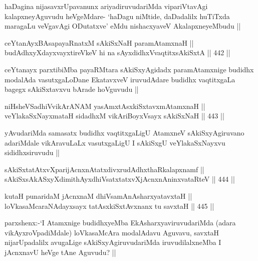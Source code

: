 \begin{artha}
haDagina nijasavxrUpavanunx ariyadiruvudariMda vipariVtavAgi kalapxneyAguvudu heVgeMdare- `haDagu niMtide, daDadalilx huTiTxda maragaLu veVgavAgi ODutatxve' eMdu nishacxyaveV AkalapxneyeMbudu ||
\end{artha}


\begin{shl}
ceYtanAyxBAsapayaRnatxM sAkiSxNaH paramAtamxnaH || \\
budAdhxyXdayxvayxtireVkeV hi na sAyxdidhxVvaqtitxsAkiSxtA ||  442 ||  
\end{shl}

\begin{artha}
ceYtanayx parxtibiMba payaRMtara sAkiSxyAgidadx paramAtamxnige budidhx modalAda vasutxgaLoDane EkatavxveV iruvudAdare budidhx vaqtitxgaLa bagegx sAkiSxtavxvu bArade hoVguvudu ||
\end{artha}


\begin{shl}
niHsheVSadhiVvikArANAM yasAmxtAsxkiSxtavxmAtamxnaH || \\
veYlakaSxNayxmataH sidadhxM vikAriBoyxV\s sayx sAkiSxNaH ||  443 || 
\end{shl}

\begin{artha}
yAvudariMda samasatx budidhx vaqtitxgaLigU AtamxneV sAkiSxyAgiruvano adariMdale vikAravuLaLx vasutxgaLigU I sAkiSxgU veYlakaSxNayxvu sididhxsiruvudu ||
\end{artha}


\begin{shl}
sAkiSxtatAtxvXparijAcnxnAtatxdivxrudAdhxthaRkalapxnamf || \\
sAkiSxsAkASxyXdimithAyxdhiVsatxtatxvXjAcnxnAninxvataRteV ||  444 || 
\end{shl}

\begin{shl}
kutaH punaridaM jAcnxnaM dhiVsamAnAsharxyatavxtaH || \\
loVkasaMcaraNAdayxsayx tatAsxkiSxtAvxnanx tu savxtaH ||  445 ||  
\end{shl}

\begin{artha}
parxshenx:-`I Atamxnige budidhxyeMba EkAsharxyaviruvudariMda (adara vikAyxroVpadiMdale) loVkasaMcAra modalAdavu Aguvavu, savxtaH nijarUpadalilx avugaLige sAkiSxyAgiruvudariMda iruvudilalxneMba I jAcnxnavU heVge tAne Aguvudu? ||
\end{artha}

